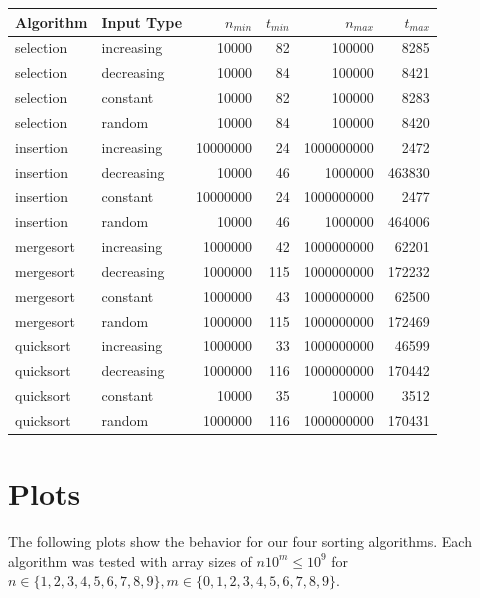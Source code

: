 \documentclass[11pt]{article}
\begin{document}
\begin{center}
\begin{tabular}{llrrrr}
Algorithm & Input Type & \(n_{min}\) & \(t_{min}\) & \(n_{max}\) & \(t_{max}\)\\
\hline
selection & increasing & 10000 & 82 & 100000 & 8285\\
selection & decreasing & 10000 & 84 & 100000 & 8421\\
selection & constant & 10000 & 82 & 100000 & 8283\\
selection & random & 10000 & 84 & 100000 & 8420\\
\hline
insertion & increasing & 10000000 & 24 & 1000000000 & 2472\\
insertion & decreasing & 10000 & 46 & 1000000 & 463830\\
insertion & constant & 10000000 & 24 & 1000000000 & 2477\\
insertion & random & 10000 & 46 & 1000000 & 464006\\
\hline
mergesort & increasing & 1000000 & 42 & 1000000000 & 62201\\
mergesort & decreasing & 1000000 & 115 & 1000000000 & 172232\\
mergesort & constant & 1000000 & 43 & 1000000000 & 62500\\
mergesort & random & 1000000 & 115 & 1000000000 & 172469\\
\hline
quicksort & increasing & 1000000 & 33 & 1000000000 & 46599\\
quicksort & decreasing & 1000000 & 116 & 1000000000 & 170442\\
quicksort & constant & 10000 & 35 & 100000 & 3512\\
quicksort & random & 1000000 & 116 & 1000000000 & 170431\\
\end{tabular}
\end{center}

\section{Plots}
\label{sec:orgad55c5e}

The following plots show the behavior for our four sorting algorithms. Each algorithm was
tested with array sizes of \(n 10^m \le 10^9\) for
\(n \in \{1, 2, 3, 4, 5, 6, 7, 8, 9\}, m \in \{0, 1, 2, 3, 4, 5, 6, 7, 8, 9\}\).
\end{document}
